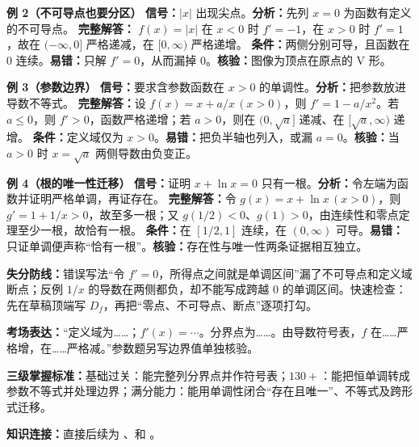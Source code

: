\begin{knowledgeBox}
\textbf{例 2（不可导点也要分区）}\quad
\textbf{信号：}\(|x|\) 出现尖点。\textbf{分析：}先列 \(x=0\) 为函数有定义的不可导点。
\textbf{完整解答：} \(f(x)=|x|\) 在 \(x<0\) 时 \(f'=-1\)，在 \(x>0\) 时 \(f'=1\)，故在 \((-\infty,0]\) 严格递减，在 \([0,\infty)\) 严格递增。
\textbf{条件：}两侧分别可导，且函数在 \(0\) 连续。\textbf{易错：}只解 \(f'=0\)，从而漏掉 \(0\)。\textbf{核验：}图像为顶点在原点的 V 形。

\textbf{例 3（参数边界）}\quad
\textbf{信号：}要求含参数函数在 \(x>0\) 的单调性。\textbf{分析：}把参数放进导数不等式。
\textbf{完整解答：}设 \(f(x)=x+a/x\,(x>0)\)，则 \(f'=1-a/x^2\)。若 \(a\le0\)，则 \(f'>0\)，函数严格递增；若 \(a>0\)，则在 \((0,\sqrt a]\) 递减、在 \([\sqrt a,\infty)\) 递增。
\textbf{条件：}定义域仅为 \(x>0\)。\textbf{易错：}把负半轴也列入，或漏 \(a=0\)。\textbf{核验：}当 \(a>0\) 时 \(x=\sqrt a\) 两侧导数由负变正。

\textbf{例 4（根的唯一性迁移）}\quad
\textbf{信号：}证明 \(x+\ln x=0\) 只有一根。\textbf{分析：}令左端为函数并证明严格单调，再证存在。
\textbf{完整解答：}令 \(g(x)=x+\ln x\,(x>0)\)，则 \(g'=1+1/x>0\)，故至多一根；又 \(g(1/2)<0\)、\(g(1)>0\)，由连续性和零点定理至少一根，故恰有一根。
\textbf{条件：}在 \([1/2,1]\) 连续，在 \((0,\infty)\) 可导。\textbf{易错：}只证单调便声称“恰有一根”。\textbf{核验：}存在性与唯一性两条证据相互独立。

\textbf{失分防线：}错误写法“令 \(f'=0\)，所得点之间就是单调区间”漏了不可导点和定义域断点；反例 \(1/x\) 的导数在两侧都负，却不能写成跨越 \(0\) 的单调区间。快速检查：先在草稿顶端写 \(D_f\)，再把“零点、不可导点、断点”逐项打勾。

\textbf{考场表达：}“定义域为……；\(f'(x)=\cdots\)。分界点为……。由导数符号表，\(f\) 在……严格增，在……严格减。”参数题另写边界值单独核验。

\textbf{三级掌握标准：}基础过关：能完整列分界点并作符号表；\(130+\)：能把恒单调转成参数不等式并处理边界；满分能力：能用单调性闭合“存在且唯一”、不等式及跨形式迁移。

\textbf{知识连接：}直接后续为 、和 。
\end{knowledgeBox}


\par

